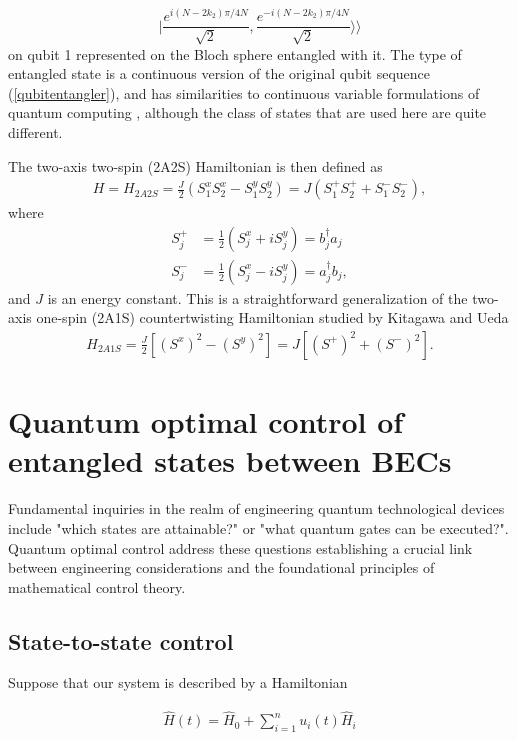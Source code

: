 \documentclass[
aps,%
12pt,%
final,%
notitlepage,%
oneside,%
onecolumn,%
nobibnotes,%
nofootinbib,%
superscriptaddress,%
noshowpacs,%
centertags]%
{revtex4}
\begin{document}
\begin{equation}
    | \frac{e^{i(N-2 k_2) \pi/4N}}{\sqrt{2}}  , \frac{e^{-i(N-2 k_2) \pi/4N}}{\sqrt{2}} \rangle \rangle
\end{equation}
%
on qubit 1 represented on the Bloch sphere entangled with it. The type of entangled state is a continuous version of the original qubit sequence (\ref{qubitentangler}), and has similarities to continuous variable formulations of quantum computing \cite{braunstein2005quantum}, although the class of states that are used here are quite different.

The two-axis two-spin (2A2S) Hamiltonian is then defined as
%
\begin{align}
H = H_{2A2S} = \frac{J}{2} (S_1^x S_2^x - S_1^y S_2^y) = J(S_1^+ S_2^+ + S_1^-S_2^-) ,
\label{eq:Hamiltonian}
\end{align}
%
where
%
\begin{align}
S_j^{+} & = \frac{1}{2} (S_j^x + i S_j^y) = b_j^\dagger a_j \nonumber \\
S_j^{-} & =  \frac{1}{2}  (S_j^x - i S_j^y)= a_j^\dagger b_j ,
\end{align}
%
and $ J $ is an energy constant. This is a straightforward generalization of the two-axis one-spin (2A1S) countertwisting Hamiltonian studied by Kitagawa and Ueda \cite{kitagawa1993squeezed}
%
\begin{align}
H_{2A1S} = \frac{J}{2} [ (S^x)^2  - (S^y)^2 ] = J[ (S^+)^2 + (S^-)^2 ] .
\end{align}
%

\section{Quantum optimal control of entangled states between BECs}

Fundamental inquiries in the realm of engineering quantum technological devices include "which states are attainable?" or "what quantum gates can be executed?". Quantum optimal control address these questions establishing a crucial link between engineering considerations and the foundational principles of mathematical control theory.

\subsection{State-to-state control}

Suppose that our system is described by a Hamiltonian

\begin{align}
\hat{H}(t) = \hat{H}_0 + \sum_{i=1}^{n} u_i(t) \hat{H}_i
\end{align}
\end{document}
